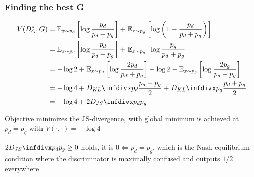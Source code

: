 \documentclass[12pt]{article}
\begin{document}
\subsubsection{Finding the best G}
\begin{equation*}
\begin{split}
V(D_G^*, G) & = \E_{x\sim p_d} \left[ \log\frac{p_d}{p_d + p_g} \right] + \E_{x\sim p_g} \left[ \log \left( 1 - \frac{p_d}{p_d + p_g} \right) \right] \\
& = \E_{x\sim p_d} \left[ \log\frac{p_d}{p_d + p_g} \right] + \E_{x\sim p_g} \left[ \log \frac{p_g}{p_d + p_g} \right] \\
& = -\log2 + \E_{x\sim p_d} \left[ \log\frac{2p_d}{p_d + p_g} \right] -\log2 + \E_{x\sim p_g} \left[ \log \frac{2p_g}{p_d + p_g} \right] \\
& = -\log4 + \dkl{p_d}{\frac{p_d + p_g}{2}} + \dkl{p_g}{\frac{p_d + p_g}{2}} \\
& = -\log4 + 2\djs{p_d}{p_g}
\end{split}
\end{equation*}
\ulb
\item Objective minimizes the JS-divergence, with global minimum is achieved at $p_d = p_g$ with $V(\cdot,\cdot) = -\log4$
\item $2\djs{p_d}{p_g} \geq 0$ holds, it is $0 \iff p_d = p_g$, which is the Nash equilibrium condition where the discriminator is maximally confused and outputs $1/2$ everywhere 
\ule
\end{document}
